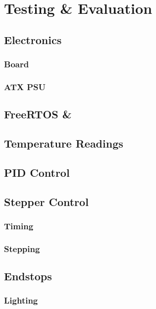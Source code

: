 \chapter{Testing \& Evaluation}
	
	\section{Electronics}
		
		\subsection{Board}
		
		\subsection{ATX PSU}
	
	\section{FreeRTOS \& \uIP}
	
	\section{Temperature Readings}
	
	\section{PID Control}
	
	\section{Stepper Control}
		
		\subsection{Timing}
		
		\subsection{Stepping}
	
	\section{Endstops}
		
		\subsection{Lighting}
	
